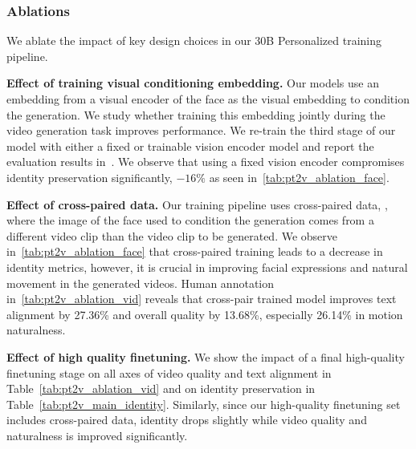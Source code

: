 \subsubsection{Ablations}
\label{sec:pt2v_ablation}
We ablate the impact of key design choices in our 30B Personalized \TextToV training pipeline.




\par \noindent \textbf{Effect of training visual conditioning embedding.}
Our models use an embedding from a visual encoder of the face as the visual embedding to condition the generation.
We study whether training this embedding jointly during the video generation task improves performance.
We re-train the third stage of our model with either a fixed or trainable vision encoder model and report the evaluation results in~.
We observe that using a fixed vision encoder compromises identity preservation significantly, $-16\%$ as seen in~\cref{tab:pt2v_ablation_face}.





\par \noindent \textbf{Effect of cross-paired data.}
Our training pipeline uses cross-paired data, \ie, where the image of the face used to condition the generation comes from a different video clip than the video clip to be generated.
We observe in~\cref{tab:pt2v_ablation_face} that cross-paired training leads to a decrease in identity metrics, however, it is crucial in improving facial expressions and natural movement in the generated videos. Human annotation in~\cref{tab:pt2v_ablation_vid} reveals that cross-pair trained model improves text alignment by 27.36\% and overall quality by 13.68\%, especially 26.14\% in motion naturalness.


\par \noindent \textbf{Effect of high quality finetuning.}
We show the impact of a final high-quality finetuning stage on all axes of video quality and text alignment in Table~\ref{tab:pt2v_ablation_vid} and on identity preservation in Table~\ref{tab:pt2v_main_identity}. Similarly, since our high-quality finetuning set includes cross-paired data, identity drops slightly while video quality and naturalness is improved significantly.




